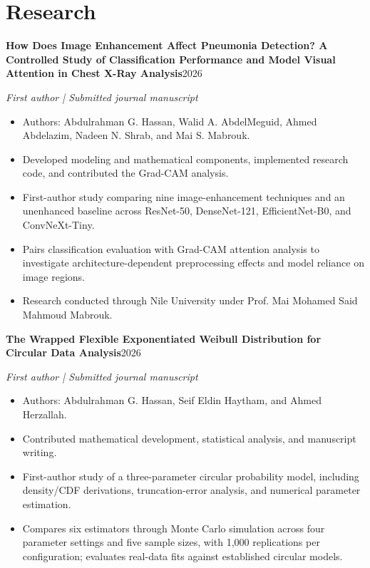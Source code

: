 \documentclass[10pt,a4paper]{article}
\newcommand{\cvitem}[3]{\par\addvspace{4pt}\textbf{#1}\hfill{\small #3}\par{\small\textit{#2}}\par}
\begin{document}
\section*{Research}
\cvitem{How Does Image Enhancement Affect Pneumonia Detection? A Controlled Study of Classification Performance and Model Visual Attention in Chest X-Ray Analysis}{First author | Submitted journal manuscript}{2026}
\begin{itemize}
\item Authors: Abdulrahman G. Hassan, Walid A. AbdelMeguid, Ahmed Abdelazim, Nadeen N. Shrab, and Mai S. Mabrouk.
\item Developed modeling and mathematical components, implemented research code, and contributed the Grad-CAM analysis.
\item First-author study comparing nine image-enhancement techniques and an unenhanced baseline across ResNet-50, DenseNet-121, EfficientNet-B0, and ConvNeXt-Tiny.
\item Pairs classification evaluation with Grad-CAM attention analysis to investigate architecture-dependent preprocessing effects and model reliance on image regions.
\item Research conducted through Nile University under Prof. Mai Mohamed Said Mahmoud Mabrouk.
\end{itemize}
\cvitem{The Wrapped Flexible Exponentiated Weibull Distribution for Circular Data Analysis}{First author | Submitted journal manuscript}{2026}
\begin{itemize}
\item Authors: Abdulrahman G. Hassan, Seif Eldin Haytham, and Ahmed Herzallah.
\item Contributed mathematical development, statistical analysis, and manuscript writing.
\item First-author study of a three-parameter circular probability model, including density/CDF derivations, truncation-error analysis, and numerical parameter estimation.
\item Compares six estimators through Monte Carlo simulation across four parameter settings and five sample sizes, with 1,000 replications per configuration; evaluates real-data fits against established circular models.
\end{itemize}
\end{document}
